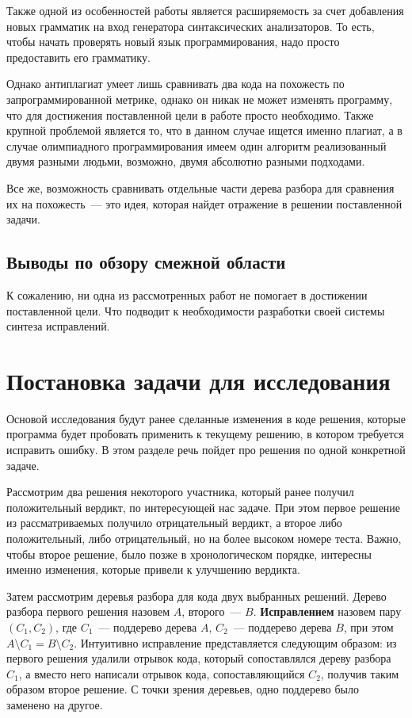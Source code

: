 Также одной из особенностей работы является расширяемость за счет добавления новых грамматик на вход 
генератора синтаксических анализаторов. То есть, чтобы начать проверять новый язык программирования, надо
просто предоставить его грамматику.

Однако антиплагиат умеет лишь сравнивать два кода на похожесть по запрограммированной метрике, однако
он никак не может изменять программу, что для достижения поставленной цели в работе просто необходимо.
Также крупной проблемой является то, что в данном случае ищется именно плагиат, а в случае олимпиадного программирования
имеем один алгоритм реализованный двумя разными людьми, возможно, двумя абсолютно разными подходами.

Все же, возможность сравнивать отдельные части дерева разбора для сравнения их на похожесть~--- это идея,
которая найдет отражение в решении поставленной задачи.                                                                                                       

\subsection{Выводы по обзору смежной области}
К сожалению, ни одна из рассмотренных работ не помогает в достижении поставленной цели.
Что подводит к необходимости разработки своей системы синтеза
исправлений.

\finishrelatedwork
\section{Постановка задачи для исследования}
Основой исследования будут ранее сделанные изменения в коде решения, которые программа будет пробовать применить к текущему решению,
в котором требуется исправить ошибку. В этом разделе речь пойдет про решения по одной конкретной задаче.

Рассмотрим два решения некоторого участника, который ранее получил положительный вердикт, по интересующей нас задаче.
При этом первое решение из рассматриваемых получило отрицательный вердикт, а второе либо положительный, либо отрицательный, но
на более высоком номере теста. Важно, чтобы второе решение, было позже в хронологическом порядке, интересны именно изменения, которые
привели к улучшению вердикта.

Затем рассмотрим деревья разбора для кода двух выбранных решений. Дерево разбора первого решения назовем $A$, второго~--- $B$.
\textbf{Исправлением} назовем пару $(C_1, C_2)$, где $C_1$~--- поддерево дерева $A$, $C_2$~--- поддерево дерева $B$,
при этом $A \setminus C_1 = B \setminus C_2$. Интуитивно исправление представляется следующим образом: из первого решения
удалили отрывок кода, который сопоставлялся дереву разбора $C_1$, а вместо него написали отрывок кода, сопоставляющийся $C_2$,
получив таким  образом второе решение. С точки зрения деревьев, одно поддерево было заменено на другое.

